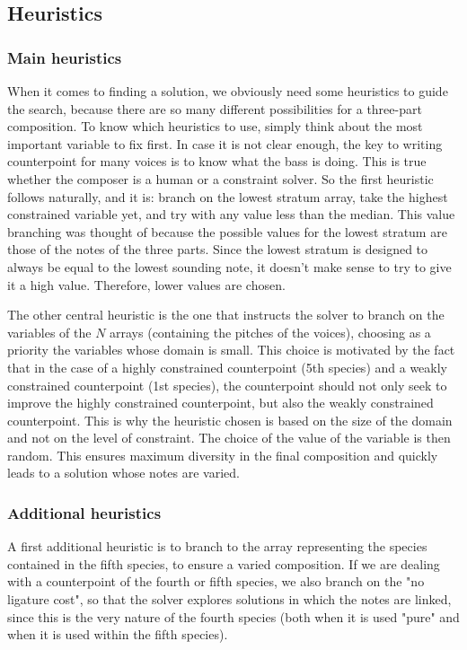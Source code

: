 \subsection{Heuristics} \label{heuristics}
\subsubsection{Main heuristics}
When it comes to finding a solution, we obviously need some heuristics to guide the search, because there are so many different possibilities for a three-part composition. 
To know which heuristics to use, simply think about the most important variable to fix first. In case it is not clear enough, the key to writing counterpoint for many voices is to know what the bass is doing. This is true whether the composer is a human or a constraint solver. So the first heuristic follows naturally, and it is: branch on the lowest stratum array, take the highest constrained variable yet, and try with any value less than the median. This value branching was thought of because the possible values for the lowest stratum are those of the notes of the three parts. Since the lowest stratum is designed to always be equal to the lowest sounding note, it doesn't make sense to try to give it a high value. Therefore, lower values are chosen.


The other central heuristic is the one that instructs the solver to branch on the variables of the $N$ arrays (containing the pitches of the voices), choosing as a priority the variables whose domain is small. This choice is motivated by the fact that in the case of a highly constrained counterpoint (5th species) and a weakly constrained counterpoint (1st species), the counterpoint should not only seek to improve the highly constrained counterpoint, but also the weakly constrained counterpoint. This is why the heuristic chosen is based on the size of the domain and not on the level of constraint. The choice of the value of the variable is then random. This ensures maximum diversity in the final composition and quickly leads to a solution whose notes are varied.


\subsubsection{Additional heuristics}
A first additional heuristic is to branch to the array representing the species contained in the fifth species, to ensure a varied composition. If we are dealing with a counterpoint of the fourth or fifth species, we also branch on the "no ligature cost", so that the solver explores solutions in which the notes are linked, since this is the very nature of the fourth species (both when it is used "pure" and when it is used within the fifth species).


